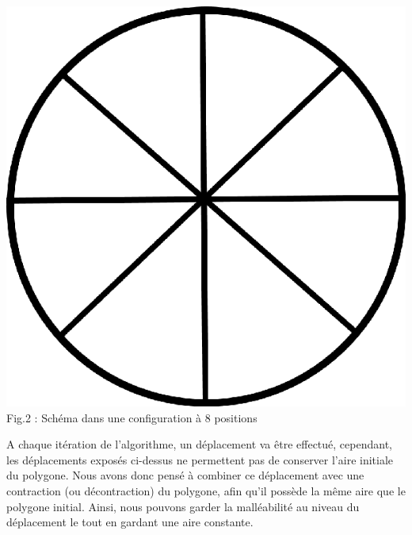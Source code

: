 \documentclass[a4paper,reqno]{article}
\newcommand{\pa}{\hspace{0.5cm}}
\begin{document}
\begin{center}
	\includegraphics[scale=0.2]{positions_circle.png}\\
	\vspace{0.2cm}
	Fig.2 : Schéma dans une configuration à 8 positions
\end{center}

\pa A chaque itération de l'algorithme, un déplacement va être effectué, cependant, les déplacements exposés ci-dessus ne permettent pas de conserver l'aire initiale du polygone. Nous avons donc pensé à combiner ce déplacement avec une contraction (ou décontraction) du polygone, afin qu'il possède la même aire que le polygone initial. Ainsi, nous pouvons garder la malléabilité au niveau du déplacement le tout en gardant une aire constante. 




\end{document}
